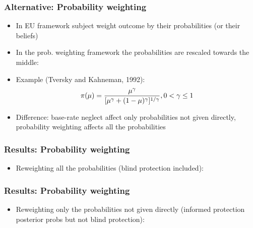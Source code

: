 \documentclass[11pt,hyperref={bookmarks=false}]{beamer}
\begin{document}
\begin{frame}
\frametitle{Alternative: Probability weighting}
\begin{itemize}
\item In EU framework subject weight outcome by their probabilities (or their beliefs)
\item In the prob. weighting framework the probabilities are rescaled towards the middle:
\item Example (Tversky and Kahneman, 1992):
$$\pi(\mu)={\mu^{\gamma}\over [\mu^{\gamma}+(1-\mu)^\gamma]^{1/\gamma}}, 0<\gamma\leq 1$$
\item Difference: base-rate neglect affect only probabilities not given directly, probability weighting affects all the probabilities
\end{itemize}
\end{frame}


\begin{frame}
\frametitle{Results: Probability weighting}
\begin{itemize}
\item Reweighting all the probabilities (blind protection included):
\end{itemize}
\footnotesize

\end{frame}


\begin{frame}
\frametitle{Results: Probability weighting}
\begin{itemize}
\item Reweighting only the probabilities not given directly (informed protection posterior probs but not blind protection):
\end{itemize}
\footnotesize

\end{frame}





\iffalse
\end{document}

